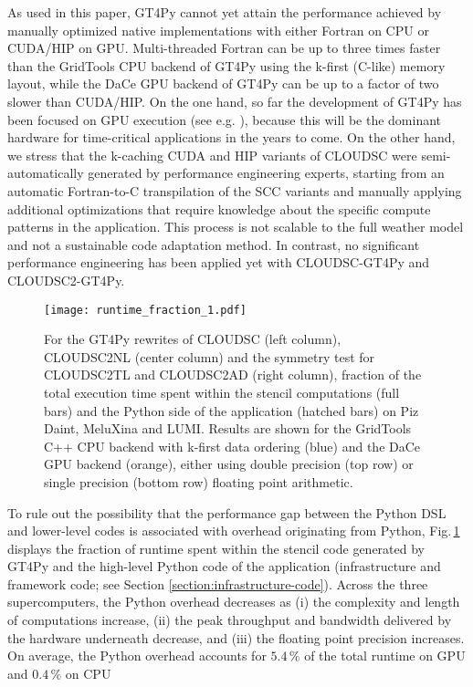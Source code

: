 \documentclass[main.tex]{subfiles}
\begin{document}
        As used in this paper, GT4Py cannot yet attain the performance achieved by manually optimized native implementations with either Fortran on CPU or CUDA/HIP on GPU. Multi-threaded Fortran can be up to three times faster than the GridTools CPU backend of GT4Py using the k-first (C-like) memory layout, while the DaCe GPU backend of GT4Py can be up to a factor of two slower than CUDA/HIP. On the one hand, so far the development of GT4Py has been focused on GPU execution (see e.g. \cite{dahm23}), because this will be the dominant hardware for time-critical applications in the years to come. On the other hand, we stress that the k-caching CUDA and HIP variants of CLOUDSC were semi-automatically generated by performance engineering experts, starting from an automatic Fortran-to-C transpilation of the SCC variants and manually applying additional optimizations that require knowledge about the specific compute patterns in the application. This process is not scalable to the full weather model and not a sustainable code adaptation method. In contrast, no significant performance engineering  has been applied yet with CLOUDSC-GT4Py and CLOUDSC2-GT4Py.

        \begin{figure}[t!]
            \centering
            \texttt{[image: runtime\_fraction\_1.pdf]}
            \caption{For the GT4Py rewrites of CLOUDSC (left column), CLOUDSC2NL (center column) and the symmetry test for CLOUDSC2TL and CLOUDSC2AD (right column), fraction of the total execution time spent within the stencil computations (full bars) and the Python side of the application (hatched bars) on Piz Daint, MeluXina and LUMI. Results are shown for the GridTools C++ CPU backend with k-first data ordering (blue) and the DaCe GPU backend (orange), either using double precision (top row) or single precision (bottom row) floating point arithmetic.}
            \label{fig:runtime-fraction}
        \end{figure}

        To rule out the possibility that the performance gap between the Python DSL and lower-level codes is associated with overhead originating from Python, Fig.\,\ref{fig:runtime-fraction} displays the fraction of runtime spent within the stencil code generated by GT4Py and the high-level Python code of the application (infrastructure and framework code; see Section \ref{section:infrastructure-code}). Across the three supercomputers, the Python overhead decreases as (i) the complexity and length of computations increase, (ii) the peak throughput and bandwidth delivered by the hardware underneath decrease, and (iii) the floating point precision increases. On average, the Python overhead accounts for $5.4\,\%$ of the total runtime on GPU and $0.4\,\%$ on CPU
\end{document}

